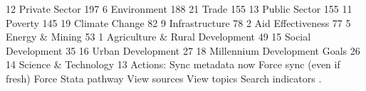    12    Private Sector                                    197
   6     Environment                                       188
   21    Trade                                             155
   13    Public Sector                                     155
   11    Poverty                                           145
   19    Climate Change                                     82
   9     Infrastructure                                     78
   2     Aid Effectiveness                                  77
   5     Energy \& Mining                                    53
   1     Agriculture \& Rural Development                    49
   15    Social Development                                 35
   16    Urban Development                                  27
   18    Millennium Development Goals                       26
   14    Science \& Technology                               13
{\smallskip}
{\smallskip}
Actions:
{\smallskip}
    Sync metadata now
    Force sync (even if fresh)
    Force Stata pathway
{\smallskip}
    View sources
    View topics
    Search indicators
{\smallskip}
{\smallskip}
. 
